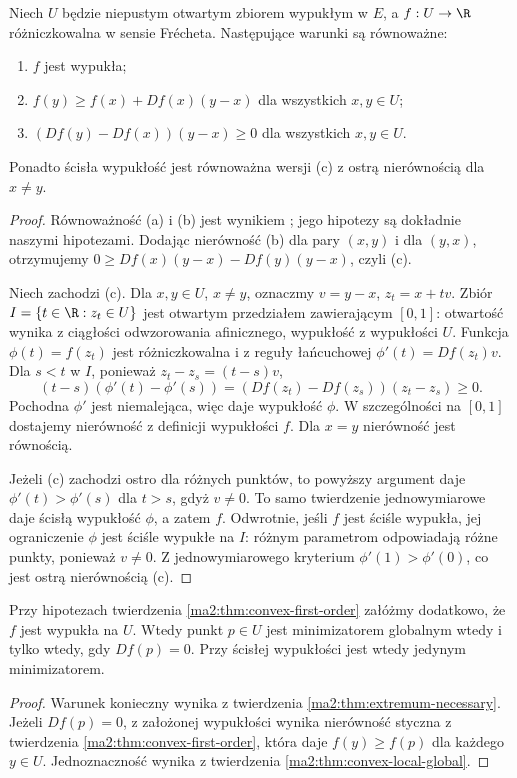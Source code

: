 \begin{twierdzenie}
\label{ma2:thm:convex-first-order}
Niech $U$ będzie niepustym otwartym zbiorem wypukłym
w $E$, a $f:U\to\R$ różniczkowalna w sensie Frécheta.
Następujące warunki są równoważne:
\begin{enumerate}[label=(\alph*)]
\item $f$ jest wypukła;
\item $f(y)\ge f(x)+Df(x)(y-x)$ dla wszystkich $x,y\in U$;
\item $(Df(y)-Df(x))(y-x)\ge0$ dla wszystkich $x,y\in U$.
\end{enumerate}
Ponadto ścisła wypukłość jest równoważna wersji (c)
z ostrą nierównością dla $x\ne y$.
\end{twierdzenie}
\begin{proof}
Równoważność (a) i (b) jest wynikiem
;
jego hipotezy są dokładnie naszymi hipotezami.
Dodając nierówność (b) dla pary $(x,y)$ i dla $(y,x)$,
otrzymujemy
$0\ge Df(x)(y-x)-Df(y)(y-x)$, czyli (c).

Niech zachodzi (c). Dla $x,y\in U$, $x\ne y$,
oznaczmy $v=y-x$, $z_t=x+tv$.
Zbiór $I=\{t\in\R:z_t\in U\}$ jest otwartym
przedziałem zawierającym $[0,1]$: otwartość wynika
z ciągłości odwzorowania afinicznego, wypukłość z
wypukłości $U$. Funkcja $\phi(t)=f(z_t)$ jest
różniczkowalna i z reguły łańcuchowej
$\phi'(t)=Df(z_t)v$.
Dla $s<t$ w $I$, ponieważ $z_t-z_s=(t-s)v$,
\[
 (t-s)(\phi'(t)-\phi'(s))
 =(Df(z_t)-Df(z_s))(z_t-z_s)\ge0.
\]
Pochodna $\phi'$ jest niemalejąca, więc
daje wypukłość $\phi$. W szczególności na $[0,1]$
dostajemy nierówność z definicji wypukłości $f$.
Dla $x=y$ nierówność jest równością.

Jeżeli (c) zachodzi ostro dla różnych punktów,
to powyższy argument daje $\phi'(t)>\phi'(s)$
dla $t>s$, gdyż $v\ne0$.
To samo twierdzenie jednowymiarowe daje ścisłą wypukłość
$\phi$, a zatem $f$.
Odwrotnie, jeśli $f$ jest ściśle wypukła, jej
ograniczenie $\phi$ jest ściśle wypukłe na $I$:
różnym parametrom odpowiadają różne punkty, ponieważ
$v\ne0$. Z jednowymiarowego kryterium
$\phi'(1)>\phi'(0)$, co jest ostrą nierównością (c).
\end{proof}

\begin{wniosek}
\label{ma2:cor:convex-stationary}
Przy hipotezach twierdzenia \ref{ma2:thm:convex-first-order}
załóżmy dodatkowo, że $f$ jest wypukła na $U$.
Wtedy punkt $p\in U$ jest minimizatorem globalnym
wtedy i tylko wtedy, gdy $Df(p)=0$.
Przy ścisłej wypukłości jest wtedy jedynym minimizatorem.
\end{wniosek}
\begin{proof}
Warunek konieczny wynika z twierdzenia
\ref{ma2:thm:extremum-necessary}.
Jeżeli $Df(p)=0$, z założonej wypukłości wynika
nierówność styczna z twierdzenia
\ref{ma2:thm:convex-first-order}, która daje $f(y)\ge f(p)$ dla każdego $y\in U$.
Jednoznaczność wynika z twierdzenia
\ref{ma2:thm:convex-local-global}.
\end{proof}


